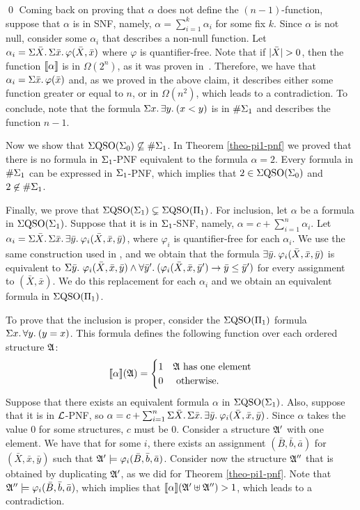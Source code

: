 \qed
Coming back on proving that $\alpha$ does not define the $(n-1)$-function, suppose that $\alpha$ is in SNF, namely, $\alpha = \sum_{i = 1}^k \alpha_i$ for some fix $k$. Since $\alpha$ is not null, consider some $\alpha_i$ that describes a non-null function. Let $\alpha_i = \Sigma{\bar{X}}.\,\Sigma{\bar{x}}.\,\varphi(\bar{X},\bar{x})$ where $\varphi$ is quantifier-free. Note that if $\vert \bar{X} \vert > 0$, then the function ${\llbracket{}{\alpha}\rrbracket}$ is in $\Omega(2^n)$, as it was proven in~\cite{SalujaST95}. Therefore, we have that $\alpha_i = \Sigma{\bar{x}}.\,\varphi(\bar{x})$ and, as we proved in the above claim, it describes either some function greater or equal to $n$, or in $\Omega(n^2)$, which leads to a contradiction. 
To conclude, note that the formula $\Sigma{x}.\, \exists{y}.\: (x < y)$ is in $\#\Sigma_{1}$ and describes the function $n-1$.

Now we show that $\Sigma{\rm QSO}(\Sigma_{0}) \not\subseteq \#\Sigma_{1}$. In Theorem \ref{theo-pi1-pnf} we proved that there is no formula in $\Sigma_{1}$-PNF equivalent to the formula $\alpha = 2$. Every formula in $\#\Sigma_{1}$ can be expressed in $\Sigma_{1}$-PNF, which implies that $2 \in \Sigma{\rm QSO}(\Sigma_{0})$ and $2 \not\in \#\Sigma_{1}$.

Finally, we prove that $\Sigma{\rm QSO}(\Sigma_{1})\subsetneq\Sigma{\rm QSO}(\Pi_{1})$. For inclusion, let $\alpha$ be a formula in $\Sigma{\rm QSO}(\Sigma_{1})$. Suppose that it is in $\Sigma_{1}$-SNF, namely, $\alpha = c + \sum_{i = 1}^{n}\alpha_i$. Let $\alpha_i = \Sigma{\bar{X}}.\,\Sigma{\bar{x}}.\,\exists{\bar{y}}.\:\varphi_i(\bar{X},\bar{x},\bar{y})$, where $\varphi_i$ is quantifier-free for each $\alpha_i$. We use the same construction used in \cite{SalujaST95}, and we obtain that the formula $\exists{\bar{y}}.\:\varphi_i(\bar{X},\bar{x},\bar{y})$ is equivalent to $\Sigma{\bar{y}}.\,\,\varphi_i(\bar{X},\bar{x},\bar{y}) \wedge \forall{\bar{y}'}.\:(\varphi_i(\bar{X},\bar{x},\bar{y}')\to\bar{y}\leq\bar{y}')$ for every assignment to $(\bar{X},\bar{x})$. We do this replacement for each $\alpha_i$ and we obtain an equivalent formula in $\Sigma{\rm QSO}(\Pi_{1})$.

To prove that the inclusion is proper, consider the $\Sigma{\rm QSO}(\Pi_{1})$ formula $\Sigma{x}.\, \forall{y}.\:(y = x)$. This formula defines the following function over each ordered structure $\mathfrak{A}$:
$$
{\llbracket{}{\alpha}\rrbracket}(\mathfrak{A}) = 
\begin{cases}
1 &\mathfrak{A} \text{ has one element}\\
0 &\text{ otherwise}.
\end{cases}
$$
Suppose that there exists an equivalent formula $\alpha$ in $\Sigma{\rm QSO}(\Sigma_{1})$. Also, suppose that it is in $\mathcal{L}$-PNF, so $\alpha = c + \sum_{i = 1}^n\Sigma{\bar{X}}.\,\Sigma{\bar{x}}.\,\exists{\bar{y}}.\:\varphi_i(\bar{X},\bar{x},\bar{y})$. Since $\alpha$ takes the value 0 for some structures, $c$ must be 0. Consider a structure $\mathfrak{A}'$ with one element. We have that for some $i$, there exists an assignment $(\bar{B},\bar{b},\bar{a})$ for $(\bar{X},\bar{x},\bar{y})$ such that $\mathfrak{A}' \models\varphi_i(\bar{B},\bar{b},\bar{a})$. Consider now the structure $\mathfrak{A}''$ that is obtained by duplicating $\mathfrak{A}'$, as we did for Theorem \ref{theo-pi1-pnf}. Note that $\mathfrak{A}''\models\varphi_i(\bar{B},\bar{b},\bar{a})$, which implies that ${\llbracket{}{\alpha}\rrbracket}(\mathfrak{A}' \uplus \mathfrak{A}'') > 1$, which leads to a contradiction.
